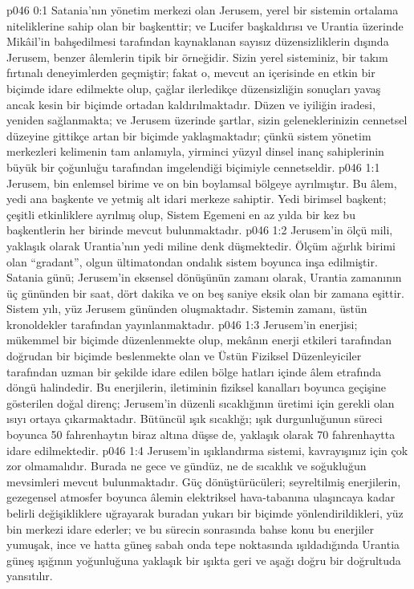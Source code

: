 \vs p046 0:1 Satania’nın yönetim merkezi olan Jerusem, yerel bir sistemin ortalama niteliklerine sahip olan bir başkenttir; ve Lucifer başkaldırısı ve Urantia üzerinde Mikâil’in bahşedilmesi tarafından kaynaklanan sayısız düzensizliklerin dışında Jerusem, benzer âlemlerin tipik bir örneğidir. Sizin yerel sisteminiz, bir takım fırtınalı deneyimlerden geçmiştir; fakat o, mevcut an içerisinde en etkin bir biçimde idare edilmekte olup, çağlar ilerledikçe düzensizliğin sonuçları yavaş ancak kesin bir biçimde ortadan kaldırılmaktadır. Düzen ve iyiliğin iradesi, yeniden sağlanmakta; ve Jerusem üzerinde şartlar, sizin geleneklerinizin cennetsel düzeyine gittikçe artan bir biçimde yaklaşmaktadır; çünkü sistem yönetim merkezleri kelimenin tam anlamıyla, yirminci yüzyıl dinsel inanç sahiplerinin büyük bir çoğunluğu tarafından imgelendiği biçimiyle cennetseldir.
\vs p046 1:1 Jerusem, bin enlemsel birime ve on bin boylamsal bölgeye ayrılmıştır. Bu âlem, yedi ana başkente ve yetmiş alt idari merkeze sahiptir. Yedi birimsel başkent; çeşitli etkinliklere ayrılmış olup, Sistem Egemeni en az yılda bir kez bu başkentlerin her birinde mevcut bulunmaktadır.
\vs p046 1:2 Jerusem’in ölçü mili, yaklaşık olarak Urantia’nın yedi miline denk düşmektedir. Ölçüm ağırlık birimi olan “gradant”, olgun ültimatondan ondalık sistem boyunca inşa edilmiştir. Satania günü; Jerusem’in eksensel dönüşünün zamanı olarak, Urantia zamanının üç gününden bir saat, dört dakika ve on beş saniye eksik olan bir zamana eşittir. Sistem yılı, yüz Jerusem gününden oluşmaktadır. Sistemin zamanı, üstün kronoldekler tarafından yayınlanmaktadır.
\vs p046 1:3 Jerusem’in enerjisi; mükemmel bir biçimde düzenlenmekte olup, mekânın enerji etkileri tarafından doğrudan bir biçimde beslenmekte olan ve Üstün Fiziksel Düzenleyiciler tarafından uzman bir şekilde idare edilen bölge hatları içinde âlem etrafında döngü halindedir. Bu enerjilerin, iletiminin fiziksel kanalları boyunca geçişine gösterilen doğal direnç; Jerusem’in düzenli sıcaklığının üretimi için gerekli olan ısıyı ortaya çıkarmaktadır. Bütüncül ışık sıcaklığı; ışık durgunluğunun süreci boyunca 50 fahrenhaytın biraz altına düşse de, yaklaşık olarak 70 fahrenhaytta idare edilmektedir.
\vs p046 1:4 Jerusem’in ışıklandırma sistemi, kavrayışınız için çok zor olmamalıdır. Burada ne gece ve gündüz, ne de sıcaklık ve soğukluğun mevsimleri mevcut bulunmaktadır. Güç dönüştürücüleri; seyreltilmiş enerjilerin, gezegensel atmosfer boyunca âlemin elektriksel hava\hyp{}tabanına ulaşıncaya kadar belirli değişikliklere uğrayarak buradan yukarı bir biçimde yönlendirildikleri, yüz bin merkezi idare ederler; ve bu sürecin sonrasında bahse konu bu enerjiler yumuşak, ince ve hatta güneş sabah onda tepe noktasında ışıldadığında Urantia güneş ışığının yoğunluğuna yaklaşık bir ışıkta geri ve aşağı doğru bir doğrultuda yansıtılır.
